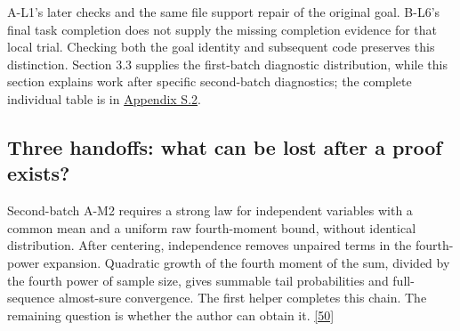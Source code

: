 A-L1's later checks and the same file support repair of the original goal. B-L6's final task completion does not supply the missing completion evidence for that local trial. Checking both the goal identity and subsequent code preserves this distinction. Section 3.3 supplies the first-batch diagnostic distribution, while this section explains work after specific second-batch diagnostics; the complete individual table is in \href{en-appendix.pdf\#s2}{Appendix S.2}.

\subsection[Three handoffs: what can be lost after a proof exists?]{\texorpdfstring{\protect\hypertarget{section-5-4}{}Three handoffs: what can be lost after a proof exists?}{Three handoffs: what can be lost after a proof exists?}}
Second-batch A-M2 requires a strong law for independent variables with a common mean and a uniform raw fourth-moment bound, without identical distribution. After centering, independence removes unpaired terms in the fourth-power expansion. Quadratic growth of the fourth moment of the sum, divided by the fourth power of sample size, gives summable tail probabilities and full-sequence almost-sure convergence. The first helper completes this chain. The remaining question is whether the author can obtain it. \hyperlink{ref-50}{\mbox{[50]}}

